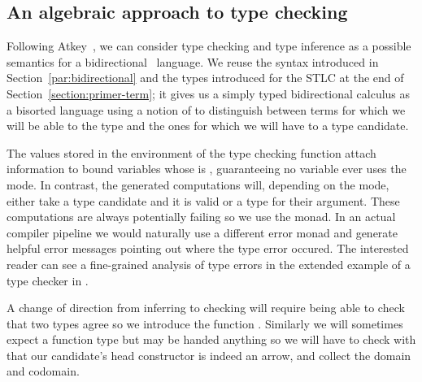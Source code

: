 \subsection{An algebraic approach to type checking}\label{section:typechecking}

Following Atkey~\citeyear{atkey2015algebraic}, we can consider type checking
and type inference as a possible semantics for a bidirectional~\cite{pierce2000local}
language. We reuse the syntax introduced in Section~\ref{par:bidirectional}
and the types introduced for the STLC at the end of Section~\ref{section:primer-term}; it
gives us a simply typed bidirectional calculus as a bisorted language using
a notion of  to distinguish between terms for which we will be able to
 the type and the ones for which we will have to  a type
candidate.

The values stored in the environment of the type checking function attach 
information to bound variables whose  is , guaranteeing no
variable ever uses the  mode. In contrast, the generated computations
will, depending on the mode, either take a type candidate and  it is
valid or  a type for their argument. These computations are always
potentially failing so we use the  monad.
In an actual compiler pipeline we would naturally use a different error monad
and generate helpful error messages pointing out where the type error occured. The
interested reader can see a fine-grained analysis of type errors in the extended
example of a type checker in \citet{DBLP:journals/jfp/McBrideM04}.

\noindent
\begin{minipage}{\textwidth}
\begin{minipage}[t]{0.40\textwidth}
\end{minipage}\hfill
\begin{minipage}[t]{0.50\textwidth}
\end{minipage}
\end{minipage}

A change of direction from inferring to checking will require being able to check
that two types agree so we introduce the function . Similarly we will
sometimes expect a function type but may be handed anything so we will have to check
with  that our candidate's head constructor is indeed an arrow, and
collect the domain and codomain.

